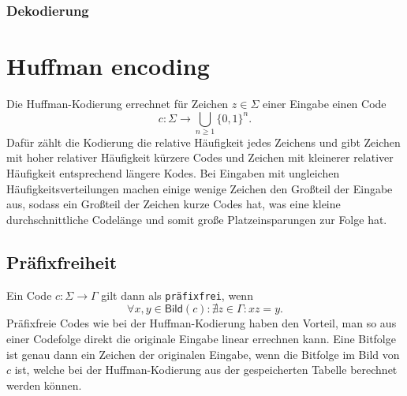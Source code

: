 \documentclass{article}
\begin{document}
\subsubsection{Dekodierung}

\newpage
\section{Huffman encoding}
Die Huffman-Kodierung errechnet für Zeichen $z \in \Sigma$ einer Eingabe einen Code 
\[c: \Sigma \to \bigcup\limits_{n\geq1} \{0,1\}^n.\]
Dafür zählt die Kodierung die relative Häufigkeit jedes Zeichens und 
gibt Zeichen mit hoher relativer Häufigkeit kürzere Codes und Zeichen mit kleinerer relativer Häufigkeit
entsprechend längere Kodes. Bei Eingaben mit ungleichen Häufigkeitsverteilungen machen
einige wenige Zeichen den Großteil der Eingabe aus, sodass ein Großteil
der Zeichen kurze Codes hat, was eine kleine durchschnittliche Codelänge und
somit große Platzeinsparungen zur Folge hat.
\subsection{Präfixfreiheit}
Ein Code $c: \Sigma \to \Gamma$ gilt dann als \texttt{präfixfrei}, wenn
\[\forall x, y \in\textsf{Bild}(c) : \nexists z \in\Gamma : xz = y.\] 
Präfixfreie Codes wie bei der Huffman-Kodierung haben den Vorteil, 
man so aus einer Codefolge direkt die 
originale Eingabe linear errechnen kann. Eine Bitfolge ist genau dann ein Zeichen 
der originalen Eingabe, wenn die Bitfolge im Bild von $c$ ist, welche bei der 
Huffman-Kodierung aus der gespeicherten Tabelle berechnet werden können.
\end{document}
